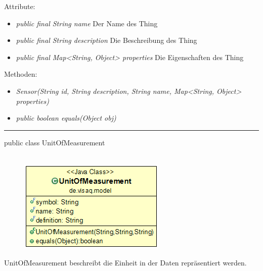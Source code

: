 Attribute:
\begin{itemize}
	\item \emph{public final String name} Der Name des Thing
	\item \emph{public final String description} Die Beschreibung des Thing
	\item \emph{public final Map<String, Object> properties} Die Eigenschaften des Thing
\end{itemize}
Methoden:
\begin{itemize}
	\item \emph{Sensor(String id, String description, String name, Map<String, Object> properties)} 
	\item \emph{public boolean equals(Object obj)} 
\end{itemize}
\clearpage %
\rule{\textwidth}{0.4pt}
public class UnitOfMeasurement
\\\\
\begin{minipage}{0.3\textwidth}
	\begin{figure}[H]
		\includegraphics[scale = 0.5
		]{media/frontend/model/UnitOfMeasurementClass.png}
	\end{figure}
\end{minipage} \hfill
\begin{minipage}{0.6\textwidth}
	 UnitOfMeasurement beschreibt die Einheit in der Daten repräsentiert werden.
\end{minipage}

